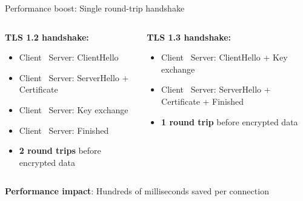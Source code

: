 \documentclass[aspectratio=169, lualatex, handout]{beamer}
\begin{document}
\begin{frame}{Performance boost: Single round-trip handshake}
	\begin{columns}[c]
		\begin{column}{0.5\textwidth}
			\textbf{TLS 1.2 handshake:}
			\begin{itemize}
				\item Client \rightarrow\ Server: ClientHello
				\item Client \leftarrow\ Server: ServerHello + Certificate
				\item Client \rightarrow\ Server: Key exchange
				\item Client \leftarrow\ Server: Finished
				\item \textbf{2 round trips} before encrypted data
			\end{itemize}
		\end{column}
		\begin{column}{0.5\textwidth}
			\textbf{TLS 1.3 handshake:}
			\begin{itemize}
				\item Client \rightarrow\ Server: ClientHello + Key exchange
				\item Client \leftarrow\ Server: ServerHello + Certificate + Finished
				\item \textbf{1 round trip} before encrypted data
			\end{itemize}
		\end{column}
	\end{columns}
	\pause
	\begin{center}
		\textbf{Performance impact}: Hundreds of milliseconds saved per connection
	\end{center}
\end{frame}
\end{document}
